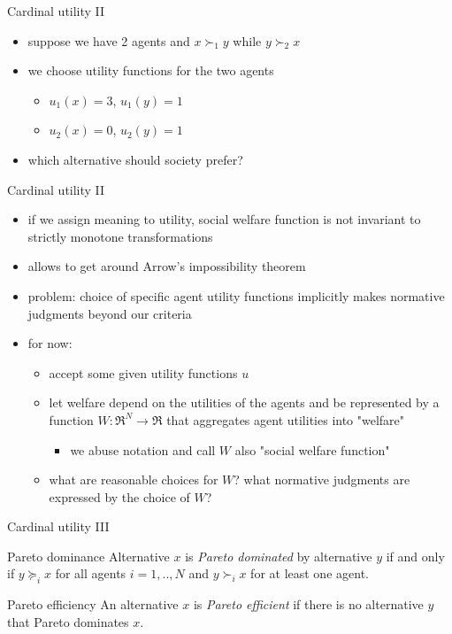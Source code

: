 \documentclass[bigger]{beamer}
\begin{document}
\begin{frame}[label={sec:orgabae04e}]{Cardinal utility II}
\begin{itemize}
\item suppose we have 2 agents and \(x\succ_1 y\) while \(y\succ_2 x\)
\item we choose utility functions for the two agents
\begin{itemize}
\item \(u_1(x)=3\), \(u_1(y)=1\)
\item \(u_2(x)=0\), \(u_2(y)=1\)
\end{itemize}
\item which alternative should society prefer?
\end{itemize}
\end{frame}
\begin{frame}[label={sec:org5457fb7}]{Cardinal utility II}
\begin{itemize}
\item if we assign meaning to utility, social welfare function is not invariant to strictly monotone transformations
\item allows to get around Arrow's impossibility theorem
\item problem: choice of specific agent utility functions implicitly makes normative judgments beyond our criteria
\item for now:
\begin{itemize}
\item accept some given utility functions \(u\)
\item let welfare depend on the utilities of the agents and be represented by a function \(W:\Re^N\rightarrow\Re\) that aggregates agent utilities into "welfare"
\begin{itemize}
\item we abuse notation and call \(W\) also "social welfare function"
\end{itemize}
\item what are reasonable choices for \(W\)? what normative judgments are expressed by the choice of \(W\)?
\end{itemize}
\end{itemize}
\end{frame}
\begin{frame}[label={sec:org4673e0b}]{Cardinal utility III}
\begin{block}{Pareto dominance}
Alternative \(x\) is \emph{Pareto dominated} by alternative \(y\) if and only if \(y\succeq_i x\) for all agents \(i=1,..,N\) and \(y\succ_i x\) for at least one agent.
\end{block}
\begin{block}{Pareto efficiency}
An alternative \(x\) is \emph{Pareto efficient} if there is no alternative \(y\) that Pareto dominates \(x\). 
\end{block}
\end{frame}
\end{document}
